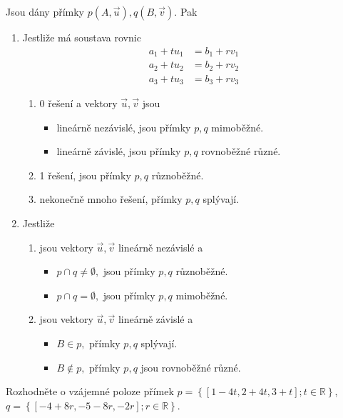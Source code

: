 \begin{veta}
    Jsou dány přímky $p(A,\vec u), q(B,\vec v).$ Pak
    \begin{enumerate}[$i.$]
    \item Jestliže má soustava rovnic
    \begin{align*}
        a_1+tu_1 &= b_1 + rv_1 \\
        a_2+tu_2 &= b_2 + rv_2 \\
        a_3+tu_3 &= b_3 + rv_3
    \end{align*}
    \begin{enumerate}[$a.$]
    \item 0 řešení a vektory $\vec u, \vec v$ jsou
    \begin{itemize}
    \item lineárně nezávislé, jsou přímky $p,q$ mimoběžné.
   	\item lineárně závislé, jsou přímky $p,q$ rovnoběžné různé.
    \end{itemize}
   	\item 1 řešení, jsou přímky $p,q$ různoběžné.
   	\item nekonečně mnoho řešení, přímky $p,q$ splývají.
    \end{enumerate}
   	\item Jestliže
    \begin{enumerate}[$a.$]
    \item jsou vektory $\vec u, \vec v$ lineárně nezávislé a
    \begin{itemize}
    \item $p\cap q \ne \emptyset,$ jsou přímky $p,q$ různoběžné.
   	\item $p\cap q = \emptyset,$ jsou přímky $p,q$ mimoběžné.
    \end{itemize}
   	\item jsou vektory $\vec u, \vec v$ lineárně závislé a
   	\begin{itemize}
    \item $B\in p,$ přímky $p,q$ splývají.
   	\item $B\notin p,$ přímky $p,q$ jsou rovnoběžné různé.
    \end{itemize}
    \end{enumerate}
    \end{enumerate}
\end{veta}

\begin{priklad}
Rozhodněte o vzájemné poloze přímek $p=\left \{ [1-4t,2+4t,3+t]; t \in \mathbb R \right \}$, $q=\left \{ [-4+8r,-5-8r,-2r]; r \in \mathbb R \right \} . $
\end{priklad}

